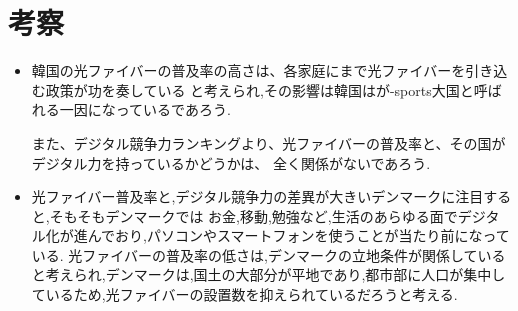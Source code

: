 \documentclass[a4paper,11pt,dvipdfmx]{ujarticle}
\begin{document}
\section{考察}
 \begin{itemize}
    \item 韓国の光ファイバーの普及率の高さは、各家庭にまで光ファイバーを引き込む政策が功を奏している
    と考えられ,その影響は韓国はが-sports大国と呼ばれる一因になっているであろう.

    また、デジタル競争力ランキングより、光ファイバーの普及率と、その国がデジタル力を持っているかどうかは、
    全く関係がないであろう.
    \item 光ファイバー普及率と,デジタル競争力の差異が大きいデンマークに注目すると,そもそもデンマークでは
    お金,移動,勉強など,生活のあらゆる面でデジタル化が進んでおり,パソコンやスマートフォンを使うことが当たり前になっている.
    光ファイバーの普及率の低さは,デンマークの立地条件が関係していると考えられ,デンマークは,国土の大部分が平地であり,都市部に人口が集中しているため,光ファイバーの設置数を抑えられているだろうと考える.
    
 \end{itemize}






%

%


\end{document}
